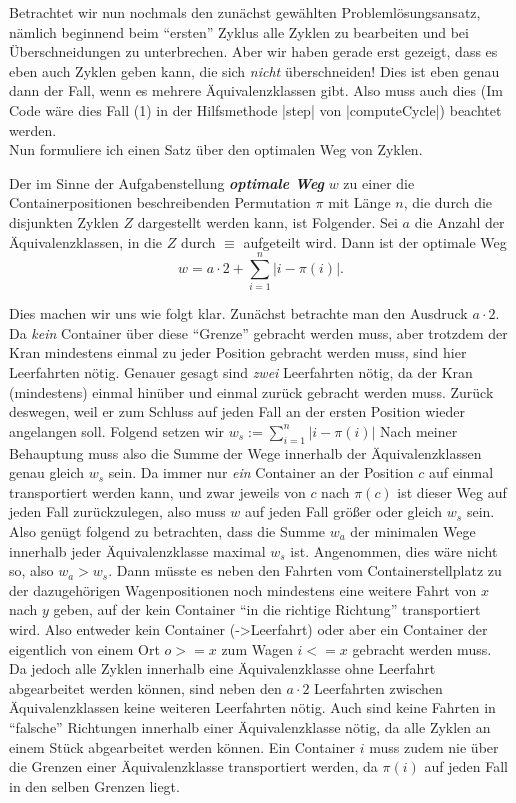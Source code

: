 Betrachtet wir nun nochmals den zunächst gewählten Problemlösungsansatz, nämlich beginnend beim ``ersten'' Zyklus alle Zyklen zu bearbeiten und bei Überschneidungen zu unterbrechen.
Aber wir haben gerade erst gezeigt, dass es eben auch Zyklen geben kann, die sich \emph{nicht} überschneiden!
Dies ist eben genau dann der Fall, wenn es mehrere Äquivalenzklassen gibt.
Also muss auch dies (Im Code wäre dies Fall (1) in der Hilfsmethode |step| von |computeCycle|) beachtet werden.\\

Nun formuliere ich einen Satz über den optimalen Weg von Zyklen.
\begin{center}
\begin{minipage}[c]{.8\textwidth}
 Der im Sinne der Aufgabenstellung \emph{\textbf{optimale Weg}} $w$ zu einer die Containerpositionen beschreibenden Permutation $\pi$ mit Länge $n$,
  die durch die disjunkten Zyklen $Z$ dargestellt werden kann, ist Folgender.
 Sei $a$ die Anzahl der Äquivalenzklassen, in die $Z$ durch $\equiv$ aufgeteilt wird.
 Dann ist der optimale Weg \[w = a \cdot 2 + \sum_{i = 1}^{n}{\lvert i-\pi(i)\rvert}. \]
\end{minipage}
\end{center}
Dies machen wir uns wie folgt klar. Zunächst betrachte man den Ausdruck $a \cdot 2$.
Da \emph{kein} Container über diese ``Grenze'' gebracht werden muss, aber trotzdem der Kran mindestens einmal zu jeder Position gebracht werden muss, sind hier Leerfahrten nötig.
Genauer gesagt sind \emph{zwei} Leerfahrten nötig, da der Kran (mindestens) einmal hinüber und einmal zurück gebracht werden muss.
Zurück deswegen, weil er zum Schluss auf jeden Fall an der ersten Position wieder angelangen soll.
Folgend setzen wir $w_s := \sum_{i = 1}^{n}{\lvert i-\pi(i)\rvert}$
Nach meiner Behauptung muss also die Summe der Wege innerhalb der Äquivalenzklassen genau gleich $w_s$ sein.
Da immer nur \emph{ein} Container an der Position $c$ auf einmal transportiert werden kann,
und zwar jeweils von $c$ nach $\pi(c)$ ist dieser Weg auf jeden Fall zurückzulegen, also muss $w$ auf jeden Fall größer oder gleich $w_s$ sein.
Also genügt folgend zu betrachten, dass die Summe $w_a$ der minimalen Wege innerhalb jeder Äquivalenzklasse maximal $w_s$ ist.
Angenommen, dies wäre nicht so, also $w_a > w_s$.
Dann müsste es neben den Fahrten vom Containerstellplatz zu der dazugehörigen Wagenpositionen noch mindestens eine weitere Fahrt von $x$ nach $y$ geben,
auf der kein Container ``in die richtige Richtung'' transportiert wird.
Also entweder kein Container (->Leerfahrt) oder aber ein Container der eigentlich von einem Ort $o >= x$ zum Wagen $i <= x$ gebracht werden muss.
Da jedoch alle Zyklen innerhalb eine Äquivalenzklasse ohne Leerfahrt abgearbeitet werden können,
sind neben den $a \cdot 2$ Leerfahrten zwischen Äquivalenzklassen keine weiteren Leerfahrten nötig.
Auch sind keine Fahrten in ``falsche'' Richtungen innerhalb einer Äquivalenzklasse nötig, da alle Zyklen an einem Stück abgearbeitet werden können. %
Ein Container $i$ muss zudem nie über die Grenzen einer Äquivalenzklasse transportiert werden, da $\pi(i)$ auf jeden Fall in den selben Grenzen liegt.

